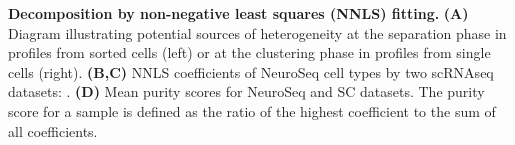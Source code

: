 \textbf{Decomposition by non-negative least squares (NNLS) fitting.}
\textbf{(A)} Diagram illustrating potential sources of heterogeneity at the separation phase in profiles from sorted cells (left) or at the clustering phase in profiles from single cells (right).
\textbf{(B,C)} NNLS coefficients of NeuroSeq cell types by two scRNAseq datasets: \citep{Tasic_2018,Zeisel_2018}.
\textbf{(D)} Mean purity scores for NeuroSeq and SC datasets. The purity score for a sample is defined as the ratio of the highest coefficient to the sum of all coefficients. 